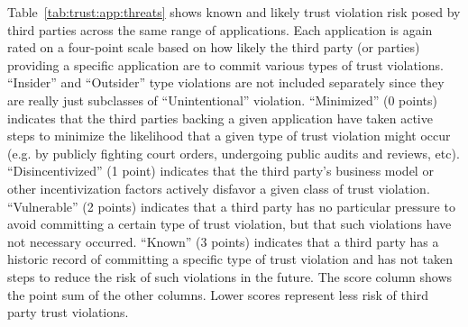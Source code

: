 Table~\ref{tab:trust:app:threats} shows known and likely trust
violation risk posed by third parties across the same range of
applications. Each application is again rated on a four-point scale
based on how likely the third party (or parties) providing a specific
application are to commit various types of trust
violations. ``Insider'' and ``Outsider'' type violations are not
included separately since they are really just subclasses of
``Unintentional'' violation. ``Minimized'' (0 points) indicates that
the third parties backing a given application have taken active steps
to minimize the likelihood that a given type of trust violation might
occur (e.g. by publicly fighting court orders, undergoing public
audits and reviews, etc). ``Disincentivized'' (1 point) indicates that
the third party's business model or other incentivization factors
actively disfavor a given class of trust violation. ``Vulnerable'' (2
points) indicates that a third party has no particular pressure to
avoid committing a certain type of trust violation, but that such
violations have not necessary occurred. ``Known'' (3 points) indicates
that a third party has a historic record of committing a specific type
of trust violation and has not taken steps to reduce the risk of such
violations in the future. The score column shows the point sum of the
other columns. Lower scores represent less risk of third party trust
violations.


